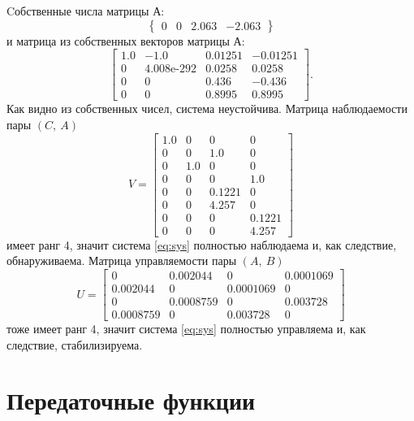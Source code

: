Cобственные числа матрицы А:
\begin{equation*}
\left\{\begin{array}{cccc}
0&
0&
2.063&
-2.063
\end{array}\right\}
\end{equation*}
и матрица из собственных векторов матрицы А:
\begin{equation*}
    \begin{bmatrix}
1.0 & -1.0 & 0.01251 & -0.01251\\
0 & \text{4.008e-292} & 0.0258 & 0.0258\\
0 & 0 & 0.436 & -0.436\\
0 & 0 & 0.8995 & 0.8995
\end{bmatrix}.
\end{equation*}
Как видно из собственных чисел, система неустойчива.
Матрица наблюдаемости пары $(C,\ A)$
\begin{equation*}
    V=\begin{bmatrix}
1.0 & 0 & 0 & 0\\
0 & 0 & 1.0 & 0\\
0 & 1.0 & 0 & 0\\
0 & 0 & 0 & 1.0\\
0 & 0 & 0.1221 & 0\\
0 & 0 & 4.257 & 0\\
0 & 0 & 0 & 0.1221\\
0 & 0 & 0 & 4.257
    \end{bmatrix}
\end{equation*}
имеет ранг 4, значит система \eqref{eq:sys} полностью наблюдаема и, как следствие, обнаруживаема.
Матрица управляемости пары $(A,\ B)$
\begin{equation*}
    U=\begin{bmatrix}
0 & 0.002044 & 0 & 0.0001069\\
0.002044 & 0 & 0.0001069 & 0\\
0 & 0.0008759 & 0 & 0.003728\\
0.0008759 & 0 & 0.003728 & 0
    \end{bmatrix}
\end{equation*}
тоже имеет ранг 4, значит система \eqref{eq:sys} полностью управляема и, как следствие, стабилизируема.

\section{Передаточные функции}

